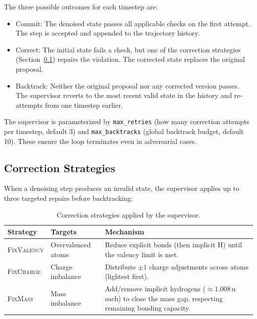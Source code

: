 \documentclass[11pt]{article}
\begin{document}
The three possible outcomes for each timestep are:

\begin{itemize}[nosep]
  \item Commit: The denoised state passes all applicable checks on the
        first attempt. The step is accepted and appended to the
        trajectory history.
  \item Correct: The initial state fails a check, but one of the
        correction strategies (Section~\ref{sec:corrections}) repairs the
        violation. The corrected state replaces the original proposal.
  \item Backtrack: Neither the original proposal nor any corrected
        version passes. The supervisor reverts to the most recent valid
        state in the history and re-attempts from one timestep earlier.
\end{itemize}

The supervisor is parameterized by \texttt{max\_retries} (how many
correction attempts per timestep, default 3) and
\texttt{max\_backtracks} (global backtrack budget, default 10). These
ensure the loop terminates even in adversarial cases.

\subsection{Correction Strategies}
\label{sec:corrections}

When a denoising step produces an invalid state, the supervisor applies
up to three targeted repairs before backtracking:

\begin{table}[H]
\centering
\caption{Correction strategies applied by the supervisor.}
\label{tab:corrections}
\begin{tabular}{@{}llp{6cm}@{}}
\toprule
Strategy & Targets & Mechanism \\
\midrule
\textsc{FixValency} & Overvalenced atoms &
  Reduce explicit bonds (then implicit H) until the valency limit is met. \\[4pt]
\textsc{FixCharge} & Charge imbalance &
  Distribute $\pm 1$ charge adjustments across atoms (lightest first). \\[4pt]
\textsc{FixMass} & Mass imbalance &
  Add/remove implicit hydrogens ($\approx 1.008$\,u each) to close the
  mass gap, respecting remaining bonding capacity. \\
\bottomrule
\end{tabular}
\end{table}
\end{document}
